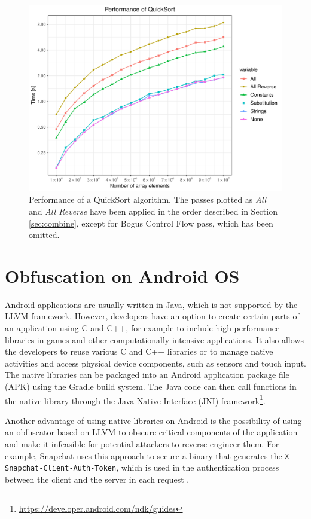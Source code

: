 \documentclass[
  digital, %
  notable,   %
  twoside, %
  nolof,     %
  nolot,     %
]{fithesis3}
\theoremstyle{definition}
\begin{document}
\begin{figure}[!h]
    \centering
    \includegraphics[height=0.38\textheight]{qs_bench.pdf}
    \caption{Performance of a QuickSort algorithm. The passes plotted as \textit{All} and \textit{All Reverse} have been applied in the order described in Section \ref{sec:combine}, except for Bogus Control Flow pass, which has been omitted.}
    \label{fig:qs_bench}
\end{figure}

\chapter{Obfuscation on Android OS} \label{chap:android}
Android applications are usually written in Java, which is not supported by the LLVM framework. However, developers have an option to create certain parts of an application using C and C++, for example to include high-performance libraries in games and other computationally intensive applications. It also allows the developers to reuse various C and C++ libraries or to manage native activities and access physical device components, such as sensors and touch input. The native libraries can be packaged into an Android application package file (APK) using the Gradle build system. The Java code can then call functions in the native library through the Java Native Interface (JNI) framework\footnote{\url{https://developer.android.com/ndk/guides}}.

Another advantage of using native libraries on Android is the possibility of using an obfuscator based on LLVM to obscure critical components of the application and make it infeasible for potential attackers to reverse engineer them. For example, Snapchat uses this approach to secure a binary that generates the \texttt{X-Snapchat-Client-Auth-Token}, which is used in the authentication process between the client and the server in each request \cite{snap_rev}. 
\end{document}
